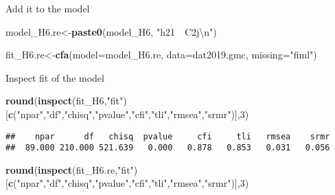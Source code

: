 \documentclass[
]{article}
\newenvironment{Shaded}{\begin{snugshade}}{\end{snugshade}}
\newcommand{\CharTok}[1]{\textcolor[rgb]{0.31,0.60,0.02}{#1}}
\newcommand{\DataTypeTok}[1]{\textcolor[rgb]{0.13,0.29,0.53}{#1}}
\newcommand{\DecValTok}[1]{\textcolor[rgb]{0.00,0.00,0.81}{#1}}
\newcommand{\KeywordTok}[1]{\textcolor[rgb]{0.13,0.29,0.53}{\textbf{#1}}}
\newcommand{\NormalTok}[1]{#1}
\newcommand{\StringTok}[1]{\textcolor[rgb]{0.31,0.60,0.02}{#1}}
\begin{document}
Add it to the model

\begin{Shaded}
\begin{Highlighting}[]
\NormalTok{model_H6.re<-}\KeywordTok{paste0}\NormalTok{(model_H6,}
                      \StringTok{"h21~~C2j}\CharTok{\textbackslash{}n}\StringTok{"}\NormalTok{)}
\end{Highlighting}
\end{Shaded}

\begin{Shaded}
\begin{Highlighting}[]
\NormalTok{fit_H6.re<-}\KeywordTok{cfa}\NormalTok{(}\DataTypeTok{model=}\NormalTok{model_H6.re,}
              \DataTypeTok{data=}\NormalTok{dat2019.gmc,}
              \DataTypeTok{missing=}\StringTok{"fiml"}\NormalTok{)}
\end{Highlighting}
\end{Shaded}

Inspect fit of the model

\begin{Shaded}
\begin{Highlighting}[]
\KeywordTok{round}\NormalTok{(}\KeywordTok{inspect}\NormalTok{(fit_H6,}\StringTok{"fit"}\NormalTok{)}
\NormalTok{      [}\KeywordTok{c}\NormalTok{(}\StringTok{"npar"}\NormalTok{,}\StringTok{"df"}\NormalTok{,}\StringTok{"chisq"}\NormalTok{,}\StringTok{"pvalue"}\NormalTok{,}\StringTok{"cfi"}\NormalTok{,}\StringTok{"tli"}\NormalTok{,}\StringTok{"rmsea"}\NormalTok{,}\StringTok{"srmr"}\NormalTok{)],}\DecValTok{3}\NormalTok{)}
\end{Highlighting}
\end{Shaded}

\begin{verbatim}
##    npar      df   chisq  pvalue     cfi     tli   rmsea    srmr 
##  89.000 210.000 521.639   0.000   0.878   0.853   0.031   0.056
\end{verbatim}

\begin{Shaded}
\begin{Highlighting}[]
\KeywordTok{round}\NormalTok{(}\KeywordTok{inspect}\NormalTok{(fit_H6.re,}\StringTok{"fit"}\NormalTok{)}
\NormalTok{      [}\KeywordTok{c}\NormalTok{(}\StringTok{"npar"}\NormalTok{,}\StringTok{"df"}\NormalTok{,}\StringTok{"chisq"}\NormalTok{,}\StringTok{"pvalue"}\NormalTok{,}\StringTok{"cfi"}\NormalTok{,}\StringTok{"tli"}\NormalTok{,}\StringTok{"rmsea"}\NormalTok{,}\StringTok{"srmr"}\NormalTok{)],}\DecValTok{3}\NormalTok{)}
\end{Highlighting}
\end{Shaded}
\end{document}
